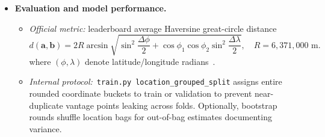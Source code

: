 \documentclass[10pt]{article}
\begin{document}
\begin{itemize}
\begin{itemize}[leftmargin=1.25em]
    \item \emph{Architectural pivot (Jeffrey).} The production path replaces regression with:
    \begin{enumerate}[label=(\alph*),leftmargin=1.75em]
        \item \textbf{Frozen DINOv2 ViT-S/14 encoder} inlined in~\texttt{model.py} with official pretrained weights (patch size~\texttt{14}, crop~\texttt{224}). Positional encodings interpolate from pretrained resolutions to our square grid.
        \item \textbf{Gallery buffers }\texttt{gallery\_emb}$\in\mathbb{R}^{N\times384}$ (\texttt{L2$\,$-norm}), \texttt{gallery\_gps}$\in\mathbb{R}^{N\times 2}$.
        \item \textbf{Soft attention readout.}
        Given batch embeddings $\mathbf{E}$, similarities $\mathbf{S}=\mathbf{E}\texttt{gallery\_emb}^{\!\top}$, weights $\boldsymbol{\Pi}=\mathrm{softmax}(\mathbf{S}\cdot T)$, prediction $\hat{\mathbf{y}}=\boldsymbol{\Pi}\texttt{gallery\_gps}$ in raw degrees\textemdash exactly the differentiable kNN mixture described in~\texttt{model.py}'s header docstring.

        Temperature~$T$ is the only optimizer-trained scalar during~\texttt{train.py}; gradients flow through softmax into Haversine loss on validation embeddings while encoder weights remain frozen\textemdash a deliberate trade-off respecting limited compute/time and guaranteeing stable features.

    \end{enumerate}

\end{itemize}



    \item \textbf{Evaluation and model performance.}
\begin{itemize}[leftmargin=1.25em]

    \item \emph{Official metric:} leaderboard average Haversine great-circle distance~\cite{faa_navigation}
    \[ d(\mathbf{a},\mathbf{b}) = 2R \arcsin\!\sqrt{
        \sin^2\frac{\Delta\phi}{2} + \cos\phi_1\cos\phi_2 \sin^2\frac{\Delta\lambda}{2}
    },\quad R=6{,}371{,}000\text{ m.}
    \]
    where $(\phi,\lambda)$ denote latitude/longitude radians~\cite{faa_navigation}.

    \item \emph{Internal protocol:}\ \texttt{train.py}~\texttt{location\_grouped\_split} assigns entire rounded coordinate buckets to train or validation to prevent near-duplicate vantage points leaking across folds. Optionally, bootstrap rounds shuffle location bags for out-of-bag estimates documenting variance.


\end{itemize}
\end{itemize}
\end{document}
